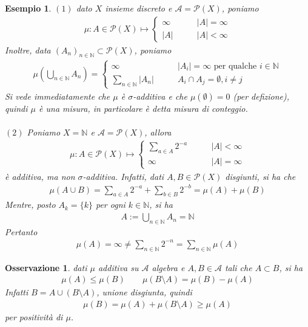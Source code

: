 \documentclass[oneside, 11pt]{amsbook}
\newcommand{\0}{{(0)}}
\newcommand{\3}{{(3)}}
\theoremstyle{colonplain}
\theoremstyle{colondefinition}
\newtheorem{ex}[thm]{Esempio}
\theoremstyle{colonremark}
\newtheorem{rmk}[thm]{Osservazione}
\numberwithin{equation}{chapter}
\begin{document}
\begin{ex}
$(1)$ dato $X$ insieme discreto e $\mathcal{A} = \mathcal{P}(X)$, poniamo
\begin{align}
    \mu : A \in \mathcal{P}(X) \mapsto \begin{cases}
        \infty \qquad &|A| = \infty \\
        |A| \qquad &|A| < \infty
    \end{cases}
\end{align}
Inoltre, data $(A_n)_{n \in \mathbb{N}} \subset \mathcal{P}(X)$, poniamo
\begin{align}
    \mu\left(\bigcup_{n \in \mathbb{N}} A_n\right) = \begin{cases}
        \infty \qquad &|A_i| = \infty \text{ per qualche } i \in \mathbb{N} \\
        \sum_{n \in \mathbb{N}} |A_n| \qquad &A_i \cap A_j = \emptyset, i \neq j
    \end{cases}
\end{align}
Si vede immediatamente che $\mu$ è $\sigma$-additiva e che $\mu(\emptyset) = 0$ (per defizione), quindi $\mu$ è una misura, in particolare è detta \textit{misura di conteggio}. \\ \\
$(2)$ Poniamo $X = \mathbb{N}$ e $\mathcal{A} = \mathcal{P}(X)$, allora
\begin{align}
    \mu : A \in \mathcal{P}(X) \mapsto \begin{cases}
        \sum_{a \in A} 2^{-a} \qquad &|A| < \infty \\
        \infty \qquad &|A| = \infty
    \end{cases}
\end{align}
è additiva, ma non $\sigma$-additiva. Infatti, dati $A, B \in \mathcal{P}(X)$ disgiunti, si ha che
\begin{align}
    \mu(A \cup B) = \sum_{a \in A}2^{-a} + \sum_{b \in B}2^{-b} = \mu(A) + \mu(B)
\end{align}
Mentre, posto $A_k = \{k\}$ per ogni $k \in \mathbb{N}$, si ha
\begin{align}
    A := \bigcup_{n \in \mathbb{N}} A_n = \mathbb{N}
\end{align}
Pertanto
\begin{align}
    \mu(A) = \infty \neq \sum_{n \in \mathbb{N}} 2^{-n} = \sum_{n \in \mathbb{N}} \mu(A)
\end{align}
\end{ex}
\begin{rmk}\label{Monotone}
dati $\mu$ additiva su $\mathcal{A}$ algebra e $A, B \in \mathcal{A}$ tali che $A \subset B$, si ha
\begin{align}
    \mu(A) \leq \mu(B) \qquad \mu(B \setminus A) = \mu(B) - \mu(A)
\end{align}
Infatti $B = A \cup (B \setminus A)$, unione disgiunta, quindi
\begin{align}
    \mu(B) = \mu(A) + \mu(B \setminus A) \geq \mu(A)
\end{align}
per positività di $\mu$.
\end{rmk}
\end{document}
